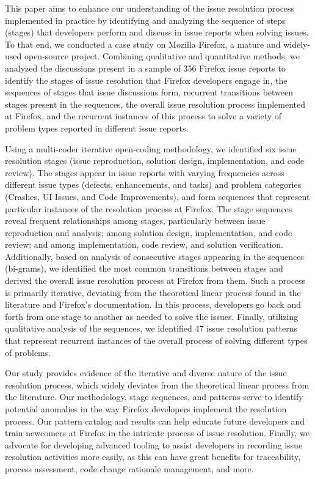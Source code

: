 This paper aims to enhance our understanding of the issue resolution process implemented in practice by identifying and analyzing the sequence of steps (\ie stages) that developers perform and discuss in issue reports when solving issues. To that end, we conducted a case study on Mozilla Firefox, a mature and widely-used open-source project. Combining qualitative and quantitative methods, we analyzed the discussions present in a sample of 356 Firefox issue reports to identify the stages of issue resolution that Firefox developers engage in, the sequences of stages that issue discussions form, recurrent transitions between stages present in the sequences, the overall issue resolution process implemented at Firefox, and the recurrent instances of this process to solve a variety of problem types reported in different issue reports. 

Using a multi-coder iterative open-coding methodology, we identified six issue resolution stages (\eg issue reproduction, solution design, implementation, and code review). The stages appear in issue reports with varying frequencies across different issue types (defects, enhancements, and tasks) and problem categories (\eg Crashes, UI Issues, and Code Improvements), and form sequences that represent particular instances of the resolution process at Firefox. The stage sequences reveal frequent relationships among stages, particularly between issue reproduction and analysis; among solution design, implementation, and code review; and among implementation, code review, and solution verification. Additionally, based on analysis of consecutive stages appearing in the sequences (\ie bi-grams), we identified the most common transitions between stages and derived the overall issue resolution process at Firefox from them. Such a process is primarily iterative, deviating from the theoretical linear process found in the literature and Firefox's documentation. In this process, developers go back and forth from one stage to another as needed to solve the issues. Finally, utilizing qualitative analysis of the sequences, we identified 47 issue resolution patterns that represent recurrent instances of the overall process of solving different types of problems. 
	
Our study provides evidence of the iterative and diverse nature of the issue resolution process, which widely deviates from the theoretical linear process from the literature. Our methodology, stage sequences, and patterns serve to identify potential anomalies in the way Firefox developers implement the resolution process.
Our pattern catalog and results can help educate future developers and train newcomers at Firefox in the intricate process of issue resolution. Finally, we advocate for developing advanced tooling to assist developers in recording issue resolution activities more easily, as this can have great benefits for traceability, process assessment, code change rationale management, and more.






